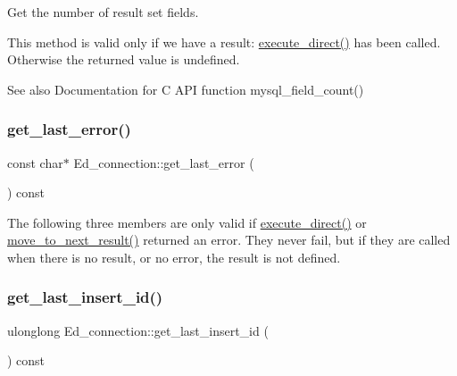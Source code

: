 Get the number of result set fields.

This method is valid only if we have a result\+: \mbox{\hyperlink{classEd__connection_a58f9da6381da4bc1455d7f22d1620d2d}{execute\+\_\+direct()}} has been called. Otherwise the returned value is undefined.

\begin{DoxySeeAlso}{See also}
Documentation for C A\+PI function mysql\+\_\+field\+\_\+count() 
\end{DoxySeeAlso}
\mbox{\label{classEd__connection_a420c219d0c2e058af3666076a2bfaa17}} 
\subsubsection{\texorpdfstring{get\+\_\+last\+\_\+error()}{get\_last\_error()}}
{\footnotesize\ttfamily const char$\ast$ Ed\+\_\+connection\+::get\+\_\+last\+\_\+error (\begin{DoxyParamCaption}{ }\end{DoxyParamCaption}) const\hspace{0.3cm}{\ttfamily [inline]}}

The following three members are only valid if \mbox{\hyperlink{classEd__connection_a58f9da6381da4bc1455d7f22d1620d2d}{execute\+\_\+direct()}} or \mbox{\hyperlink{classEd__connection_aa4c7282bcb1c1fdf2fa966a2106c71bd}{move\+\_\+to\+\_\+next\+\_\+result()}} returned an error. They never fail, but if they are called when there is no result, or no error, the result is not defined. \mbox{\label{classEd__connection_a5a3a3b208a58521911bddc57732cecc7}} 
\subsubsection{\texorpdfstring{get\+\_\+last\+\_\+insert\+\_\+id()}{get\_last\_insert\_id()}}
{\footnotesize\ttfamily ulonglong Ed\+\_\+connection\+::get\+\_\+last\+\_\+insert\+\_\+id (\begin{DoxyParamCaption}{ }\end{DoxyParamCaption}) const\hspace{0.3cm}{\ttfamily [inline]}}

